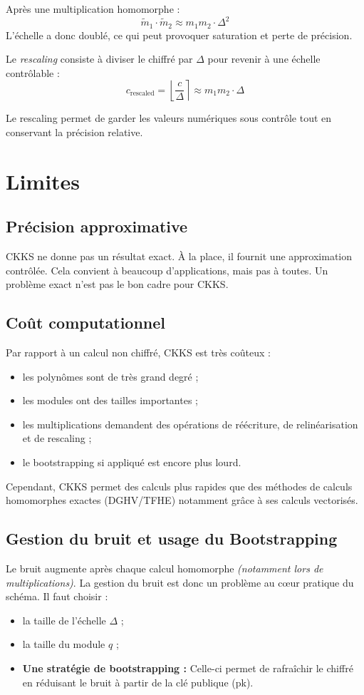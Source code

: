 Après une multiplication homomorphe :
\[
\tilde{m}_1 \cdot \tilde{m}_2 \approx m_1 m_2 \cdot \Delta^2
\]
L'échelle a donc doublé, ce qui peut provoquer saturation et perte de précision.

Le \emph{rescaling} consiste à diviser le chiffré par $\Delta$ pour revenir à une échelle contrôlable :
\[
c_{\text{rescaled}} = \left\lfloor \frac{c}{\Delta} \right\rceil \approx m_1 m_2 \cdot \Delta
\]

Le rescaling permet de garder les valeurs numériques sous contrôle tout en conservant la précision relative.

\section{Limites}

\subsection{Précision approximative}

CKKS ne donne pas un résultat exact. À la place, il fournit une approximation contrôlée. Cela convient à beaucoup d'applications, mais pas à toutes. Un problème exact n'est pas le bon cadre pour CKKS.

\subsection{Coût computationnel}

Par rapport à un calcul non chiffré, CKKS est très coûteux :
\begin{itemize}[leftmargin=2em]
  \item les polynômes sont de très grand degré ;
  \item les modules ont des tailles importantes ;
  \item les multiplications demandent des opérations de réécriture, de relinéarisation et de rescaling ;
  \item le bootstrapping si appliqué est encore plus lourd.
\end{itemize}

Cependant, CKKS permet des calculs plus rapides que des méthodes de calculs homomorphes exactes (DGHV/TFHE) notamment grâce à ses calculs vectorisés.

\subsection{Gestion du bruit et usage du Bootstrapping}
Le bruit augmente après chaque calcul homomorphe \emph{(notamment lors de multiplications)}.
La gestion du bruit est donc un problème au cœur pratique du schéma. Il faut choisir :
\begin{itemize}[leftmargin=2em]
  \item la taille de l'échelle $\Delta$ ;
  \item la taille du module $q$ ;
  \item \textbf{Une stratégie de bootstrapping :} Celle-ci permet de rafraîchir le chiffré en réduisant le bruit à partir de la clé publique (pk). 
\end{itemize}

